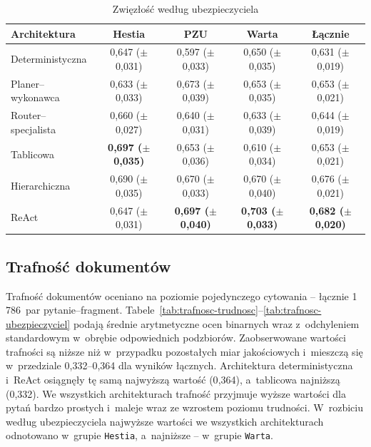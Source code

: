   \begin{table}[H]
    \caption{Zwięzłość według ubezpieczyciela}\label{tab:zwiezlosc-ubezpieczyciel}
    \centering
    \small
    \renewcommand{\arraystretch}{1.3}
    \begin{tabular}{@{} l c c c c @{}}
      \toprule
      \textbf{Architektura}
      & \textbf{Hestia}
      & \textbf{PZU}
      & \textbf{Warta}
      & \textbf{Łącznie}                                                                                                                              \\
      \midrule
      Deterministyczna    & 0{,}647 (\(\pm\) 0{,}031)          & 0{,}597 (\(\pm\) 0{,}033)          & 0{,}650 (\(\pm\) 0{,}035)          & 0{,}631 (\(\pm\) 0{,}019)          \\
      Planer--wykonawca   & 0{,}633 (\(\pm\) 0{,}033)          & 0{,}673 (\(\pm\) 0{,}039)          & 0{,}653 (\(\pm\) 0{,}035)          & 0{,}653 (\(\pm\) 0{,}021)          \\
      Router--specjalista & 0{,}660 (\(\pm\) 0{,}027)          & 0{,}640 (\(\pm\) 0{,}031)          & 0{,}633 (\(\pm\) 0{,}039)          & 0{,}644 (\(\pm\) 0{,}019)          \\
      Tablicowa           & \textbf{0{,}697 (\(\pm\) 0{,}035)} & 0{,}653 (\(\pm\) 0{,}036)          & 0{,}610 (\(\pm\) 0{,}034)          & 0{,}653 (\(\pm\) 0{,}021)          \\
      Hierarchiczna       & 0{,}690 (\(\pm\) 0{,}035)          & 0{,}670 (\(\pm\) 0{,}033)          & 0{,}670 (\(\pm\) 0{,}040)          & 0{,}676 (\(\pm\) 0{,}021)          \\
      ReAct               & 0{,}647 (\(\pm\) 0{,}031)          & \textbf{0{,}697 (\(\pm\) 0{,}040)} & \textbf{0{,}703 (\(\pm\) 0{,}033)} & \textbf{0{,}682 (\(\pm\) 0{,}020)} \\
      \bottomrule
    \end{tabular}
  \end{table}

  \subsection{Trafność dokumentów}\label{subsec:wyniki-trafnosc}

  Trafność dokumentów oceniano na poziomie pojedynczego cytowania -- łącznie
  1\,786~par pytanie--fragment.
  Tabele~\ref{tab:trafnosc-trudnosc}--\ref{tab:trafnosc-ubezpieczyciel} podają
  średnie arytmetyczne ocen binarnych wraz z~odchyleniem standardowym w~obrębie
  odpowiednich podzbiorów. Zaobserwowane wartości trafności są niższe niż
  w~przypadku pozostałych miar jakościowych i~mieszczą się w~przedziale
  0{,}332--0{,}364 dla wyników łącznych. Architektura deterministyczna i~ReAct
  osiągnęły tę samą najwyższą wartość (0{,}364), a~tablicowa najniższą (0{,}332).
  We wszystkich architekturach trafność przyjmuje wyższe wartości dla pytań
  bardzo prostych i~maleje wraz ze wzrostem poziomu trudności. W~rozbiciu według
  ubezpieczyciela najwyższe wartości we wszystkich architekturach odnotowano
  w~grupie \texttt{Hestia}, a~najniższe -- w~grupie \texttt{Warta}.

